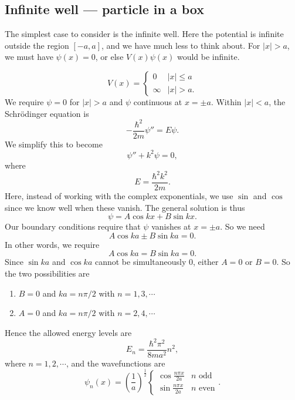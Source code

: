 \documentclass[a4paper]{article}
\begin{document}
\subsection{Infinite well --- particle in a box}
The simplest case to consider is the infinite well. Here the potential is infinite outside the region $[-a, a]$, and we have much less to think about. For $|x| > a$, we must have $\psi(x) = 0$, or else $V(x) \psi(x)$ would be infinite.
\begin{center}
\end{center}
\[
  V(x) =
  \begin{cases}
    0 & |x| \leq a\\
    \infty & |x| > a.
  \end{cases}
\]
We require $\psi = 0$ for $|x| > a$ and $\psi$ continuous at $x = \pm a$. Within $|x| < a$, the Schr\"odinger equation is
\[
  -\frac{\hbar^2}{2m}\psi'' = E\psi.
\]
We simplify this to become
\[
  \psi'' + k^2 \psi = 0,
\]
where
\[
  E = \frac{\hbar^2 k^2}{2m}.
\]
Here, instead of working with the complex exponentials, we use $\sin$ and $\cos$ since we know well when these vanish. The general solution is thus
\[
  \psi = A\cos kx + B\sin kx.
\]
Our boundary conditions require that $\psi$ vanishes at $x = \pm a$. So we need
\[
  A \cos ka \pm B\sin ka = 0.
\]
In other words, we require
\[
  A\cos ka = B\sin ka = 0.
\]
Since $\sin ka$ and $\cos ka$ cannot be simultaneously $0$, either $A = 0$ or $B = 0$. So the two possibilities are
\begin{enumerate}
  \item $B = 0$ and $ka = n\pi/2$ with $n = 1, 3, \cdots$
  \item $A = 0$ and $ka = n\pi/2$ with $n = 2, 4, \cdots$
\end{enumerate}
Hence the allowed energy levels are
\[
  E_n = \frac{\hbar^2 \pi^2}{8ma^2} n^2,
\]
where $n = 1, 2, \cdots$, and the wavefunctions are
\[
  \psi_n(x) = \left(\frac{1}{a}\right)^{\frac{1}{2}}
  \begin{cases}
    \cos \frac{n\pi x}{2a} & n\text{ odd}\\
    \sin \frac{n\pi x}{2a} & n\text{ even}
  \end{cases}.
\]
\end{document}
